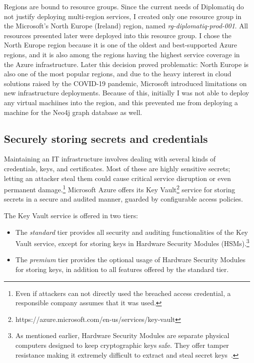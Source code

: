 Regions are bound to resource groups. Since the current needs of Diplomatiq do not justify deploying multi-region services, I created only one resource group in the Microsoft's North Europe (Ireland) region, named \emph{rg-diplomatiq-prod-001}. All resources presented later were deployed into this resource group. I chose the North Europe region because it is one of the oldest and best-supported Azure regions, and it is also among the regions having the highest service coverage in the Azure infrastructure. Later this decision proved problematic: North Europe is also one of the most popular regions, and due to the heavy interest in cloud solutions raised by the COVID-19 pandemic, Microsoft introduced limitations on new infrastructure deployments. Because of this, initially I was not able to deploy any virtual machiines into the region, and this prevented me from deploying a machine for the Neo4j graph database as well.

\subsection{Securely storing secrets and credentials}

Maintaining an IT infrastructure involves dealing with several kinds of credentials, keys, and certificates. Most of these are highly sensitive secrets; letting an attacker steal them could cause critical service disruption or even permanent damage.\footnote{Even if attackers can not directly used the breached access credential, a responsible company assumes that it was used.} Microsoft Azure offers its Key Vault\footnote{https://azure.microsoft.com/en-us/services/key-vault} service for storing secrets in a secure and audited manner, guarded by configurable access policies.

The Key Vault service is offered in two tiers:

\begin{itemize}
\item The \emph{standard} tier provides all security and auditing functionalities of the Key Vault service, except for storing keys in Hardware Security Modules (HSMs).\footnote{As mentioned earlier, Hardware Security Modules are separate physical computers designed to keep cryptographic keys safe. They offer tamper resistance making it extremely difficult to extract and steal secret keys~\cite{fips-140-3}.}
\item The \emph{premium} tier provides the optional usage of Hardware Security Modules for storing keys, in addition to all features offered by the standard tier.
\end{itemize}

